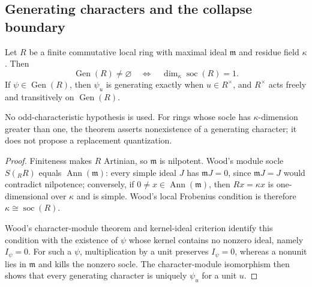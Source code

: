 
\subsection{Generating characters and the collapse boundary}

\statusProved
\begin{theorem}
\label{thm:local-frobenius-criterion}
Let $R$ be a finite commutative local ring with maximal ideal
$\mathfrak m$ and residue field $\kappa$.  Then
\[
 \operatorname{Gen}(R)\neq\varnothing
 \quad\Longleftrightarrow\quad
 \dim_\kappa\operatorname{soc}(R)=1.
\]
If $\psi\in\operatorname{Gen}(R)$, then $\psi_u$ is generating exactly when
$u\in R^\times$, and $R^\times$ acts freely and transitively on
$\operatorname{Gen}(R)$.
\end{theorem}

\begin{scope}
No odd-characteristic hypothesis is used.  For rings whose socle has
$\kappa$-dimension greater than one, the theorem asserts nonexistence of a
generating character; it does not propose a replacement quantization.
\end{scope}


\begin{proof}
Finiteness makes $R$ Artinian, so $\mathfrak m$ is nilpotent.  Wood's module
socle $S({}_RR)$ equals $\operatorname{Ann}(\mathfrak m)$: every simple ideal
$J$ has $\mathfrak mJ=0$, since $\mathfrak mJ=J$ would contradict
nilpotence; conversely, if $0\neq x\in\operatorname{Ann}(\mathfrak m)$, then
$Rx=\kappa x$ is one-dimensional over $\kappa$ and is simple.  Wood's local
Frobenius condition is therefore
$\kappa\cong\operatorname{soc}(R)$.

Wood's character-module theorem and kernel-ideal criterion identify this
condition with the existence of $\psi$ whose kernel contains no nonzero
ideal, namely $I_\psi=0$.  For such a $\psi$, multiplication by a unit
preserves $I_\psi=0$, whereas a nonunit lies in $\mathfrak m$ and kills the
nonzero socle.  The character-module isomorphism then shows that every
generating character is uniquely $\psi_u$ for a unit $u$.
\end{proof}

